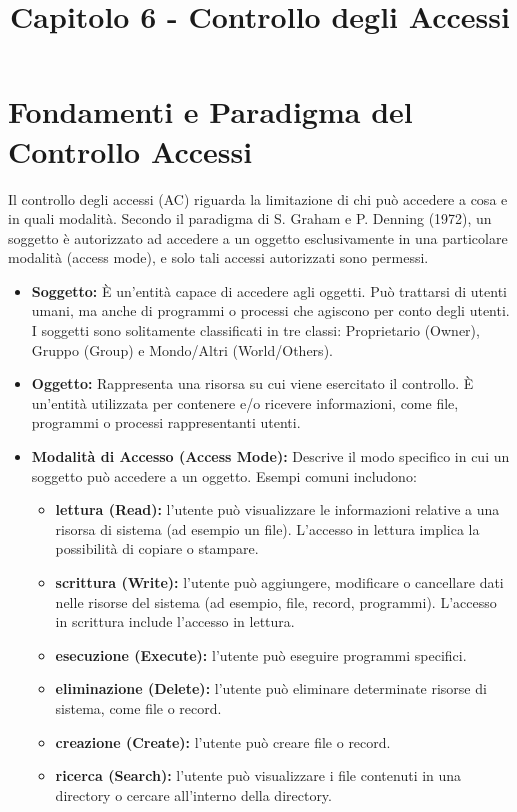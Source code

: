 \documentclass{article}
\title{Capitolo 6 - Controllo degli Accessi}
\author{}
\date{}
\begin{document}
\maketitle

\section*{Fondamenti e Paradigma del Controllo Accessi}

Il controllo degli accessi (AC) riguarda la limitazione di chi può accedere a cosa e in quali modalità. Secondo il paradigma di S. Graham e P. Denning (1972), un soggetto è autorizzato ad accedere a un oggetto esclusivamente in una particolare modalità (access mode), e solo tali accessi autorizzati sono permessi.

\begin{itemize}
    \item \textbf{Soggetto:} È un'entità capace di accedere agli oggetti. Può trattarsi di utenti umani, ma anche di programmi o processi che agiscono per conto degli utenti. I soggetti sono solitamente classificati in tre classi: Proprietario (Owner), Gruppo (Group) e Mondo/Altri (World/Others).
    \item \textbf{Oggetto:} Rappresenta una risorsa su cui viene esercitato il controllo. È un'entità utilizzata per contenere e/o ricevere informazioni, come file, programmi o processi rappresentanti utenti.
    \item \textbf{Modalità di Accesso (Access Mode):} Descrive il modo specifico in cui un soggetto può accedere a un oggetto. Esempi comuni includono:
    \begin{itemize}
        \item \textbf{lettura (Read):} l'utente può visualizzare le informazioni relative a una risorsa di sistema (ad esempio un file). L'accesso in lettura implica la possibilità di copiare o stampare.
        \item \textbf{scrittura (Write):} l'utente può aggiungere, modificare o cancellare dati nelle risorse del sistema (ad esempio, file, record, programmi). L'accesso in scrittura include l'accesso in lettura.
        \item \textbf{esecuzione (Execute):} l'utente può eseguire programmi specifici.
        \item \textbf{eliminazione (Delete):} l'utente può eliminare determinate risorse di sistema, come file o record.
        \item \textbf{creazione (Create):} l'utente può creare file o record.
        \item \textbf{ricerca (Search):} l'utente può visualizzare i file contenuti in una directory o cercare all'interno della directory.
    \end{itemize}
\end{itemize}
\end{document}
